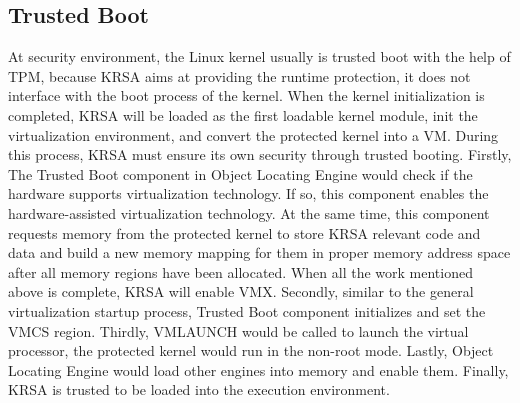 \documentclass[conference]{IEEEtran}
\begin{document}
\subsection{Trusted Boot} \label{sec:trustedboot}
At security environment, the Linux kernel usually is trusted boot with the help of TPM, because KRSA aims at providing the runtime protection, it does not interface with the boot process of the kernel. When the kernel initialization is completed, KRSA will be loaded as the first loadable kernel module, init the virtualization environment, and convert the protected kernel into a VM. During this process, KRSA must ensure its own security through trusted booting.
Firstly, The Trusted Boot component in Object Locating Engine would check if the hardware supports virtualization technology. If so, this component enables the hardware-assisted virtualization technology. At the same time, this component requests memory from the protected kernel to store KRSA relevant code and data and build a new memory mapping for them in proper memory address space after all memory regions have been allocated. When all the work mentioned above is complete, KRSA will enable VMX. Secondly, similar to the general virtualization startup process, Trusted Boot component initializes and set the VMCS region. Thirdly, VMLAUNCH would be called to launch the virtual processor, the protected kernel would run in the non-root mode. Lastly, Object Locating Engine would load other engines into memory and enable them. Finally, KRSA is trusted to be loaded into the execution environment. 
\end{document}
